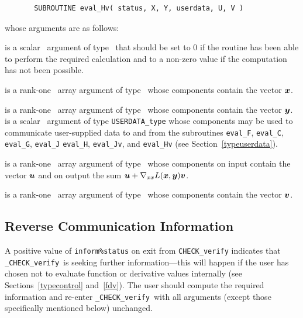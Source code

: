 \documentclass{galahad}
\newcommand{\packagename}{CHECK}
\newcommand{\fullpackagename}{\libraryname\_\packagename}
\newcommand{\solver}{{\tt \fullpackagename\_verify}}
\begin{document}
\def\baselinestretch{0.8}
{\tt \begin{verbatim}
       SUBROUTINE eval_Hv( status, X, Y, userdata, U, V ) \end{verbatim} }
\def\baselinestretch{1.0}
\noindent whose arguments are as follows:

\begin{description}
 is a scalar \intentout\ argument of type \integer\
that should be set to 0 if the routine has been able to perform the
required calculation and to a non-zero value if the computation has not
been possible. 

 is a rank-one \intentin\ array argument of type \realdp\
whose components contain the vector ${\bm{x}}$.

 is a rank-one \intentin\ array argument of type \realdp\
whose components contain the vector ${\bm{y}}$.
 is a scalar \intentinout\ argument of type 
{\tt USERDATA\_type} whose components may be used
to communicate user-supplied data to and from the
subroutines {\tt eval\_F}, {\tt eval\_C}, {\tt eval\_G}, {\tt eval\_J}
{\tt eval\_H}, {\tt eval\_Jv}, and {\tt eval\_Hv} 
(see Section~\ref{typeuserdata}). 

\ittf{U} is a rank-one \intentinout\ array argument of type \realdp\
whose components on input contain the vector ${\bm{u}}$ and on output the
sum ${\bm{u}} + \nabla_{xx} L({\bm{x}},{\bm{y}}) {\bm{v}}$.

\ittf{V} is a rank-one \intentin\ array argument of type \realdp\
whose components contain the vector ${\bm{v}}$.


\end{description}


\subsection{\label{reverse}Reverse Communication Information}

A positive value of {\tt inform\%status} on exit from 
{\tt \packagename\_verify}
indicates that
\solver\ is seeking further information---this will happen 
if the user has chosen not to evaluate function or 
derivative values internally (see Sections~\ref{typecontrol} and~\ref{fdv}).
The user should compute the required information and re-enter \solver\
with all arguments (except those specifically mentioned below) unchanged.
\end{document}

